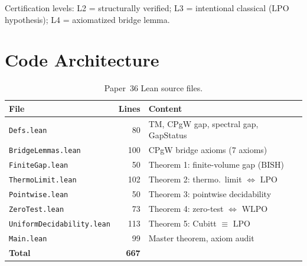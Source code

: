 \documentclass[11pt,a4paper]{article}
\theoremstyle{plain}
\theoremstyle{definition}
\newcommand{\LPO}{\ensuremath{\mathrm{LPO}}}
\newcommand{\WLPO}{\ensuremath{\mathrm{WLPO}}}
\newcommand{\BISH}{\ensuremath{\mathrm{BISH}}}
\begin{document}
Certification levels: L2 = structurally verified; L3 = intentional
classical ($\LPO$ hypothesis); L4 = axiomatized bridge lemma.

\section{Code Architecture}\label{sec:code}

\begin{table}[ht]
\centering
\caption{Paper~36 Lean source files.}
\label{tab:files}
\begin{tabular}{@{}lrl@{}}
\toprule
\textbf{File} & \textbf{Lines} & \textbf{Content} \\
\midrule
\texttt{Defs.lean}               &  80 & TM, CPgW gap, spectral gap, GapStatus \\
\texttt{BridgeLemmas.lean}       & 100 & CPgW bridge axioms (7 axioms) \\
\texttt{FiniteGap.lean}          &  50 & Theorem 1: finite-volume gap ($\BISH$) \\
\texttt{ThermoLimit.lean}        & 102 & Theorem 2: thermo.\ limit $\iff$ $\LPO$ \\
\texttt{Pointwise.lean}          &  50 & Theorem 3: pointwise decidability \\
\texttt{ZeroTest.lean}           &  73 & Theorem 4: zero-test $\iff$ $\WLPO$ \\
\texttt{UniformDecidability.lean}&  113 & Theorem 5: Cubitt $\equiv$ $\LPO$ \\
\texttt{Main.lean}               &  99 & Master theorem, axiom audit \\
\midrule
\textbf{Total}                   & \textbf{667} & \\
\bottomrule
\end{tabular}
\end{table}
\end{document}
